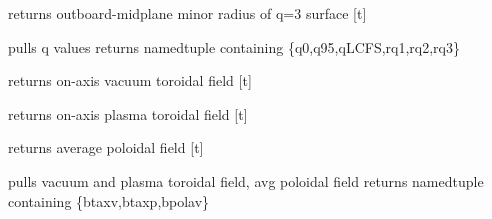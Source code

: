 \documentclass[letterpaper,10pt,english]{sphinxmanual}
\begin{document}
\begin{fulllineitems}

\begin{fulllineitems}
\label{eqtools:eqtools.EFIT.EFITTree.getQ3Surf}
returns outboard-midplane minor radius of q=3 surface {[}t{]}

\end{fulllineitems}


\begin{fulllineitems}
\label{eqtools:eqtools.EFIT.EFITTree.getQs}
pulls q values
returns namedtuple containing \{q0,q95,qLCFS,rq1,rq2,rq3\}

\end{fulllineitems}


\begin{fulllineitems}
\label{eqtools:eqtools.EFIT.EFITTree.getBtVac}
returns on-axis vacuum toroidal field {[}t{]}

\end{fulllineitems}


\begin{fulllineitems}
\label{eqtools:eqtools.EFIT.EFITTree.getBtPla}
returns on-axis plasma toroidal field {[}t{]}

\end{fulllineitems}


\begin{fulllineitems}
\label{eqtools:eqtools.EFIT.EFITTree.getBpAvg}
returns average poloidal field {[}t{]}

\end{fulllineitems}


\begin{fulllineitems}
\label{eqtools:eqtools.EFIT.EFITTree.getFields}
pulls vacuum and plasma toroidal field, avg poloidal field
returns namedtuple containing \{btaxv,btaxp,bpolav\}


\end{fulllineitems}
\end{fulllineitems}
\end{document}
